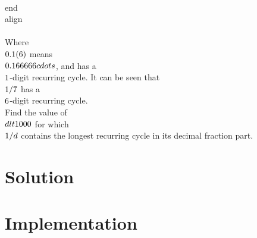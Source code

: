 \documentclass{article}
\begin{document}
\\end\\{align\\}\\
Where \\$0.1(6)\\$ means \\$0.166666\\cdots\\$, and has a \\$1\\$-digit recurring cycle. It can be seen that \\$1/7\\$ has a \\$6\\$-digit recurring cycle.\\
Find the value of \\$d \\lt 1000\\$ for which \\$1/d\\$ contains the longest recurring cycle in its decimal fraction part.

\section*{Solution}


\section*{Implementation}

\end{document}
